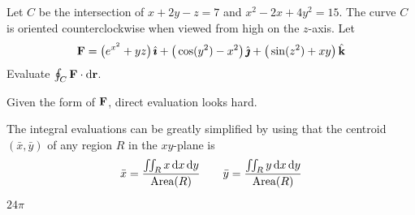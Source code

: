 \begin{question}
Let $C$ be the intersection of $x+2y-z=7$ and $x^2-2x+4y^2=15$.
The curve $C$ is oriented counterclockwise when viewed from high on the
$z$-axis. Let
\begin{equation*}
\mathbf{F}=\big(e^{x^2}+yz\big)\,\hat{\pmb{\imath}}
   +\big(\cos(y^2)-x^2\big)\,\hat{\pmb{\jmath}}
   +\big(\sin(z^2)+xy\big)\,\hat{\mathbf{k}}
\end{equation*}
Evaluate $\oint_C\mathbf{F}\cdot \mathrm{d}\mathbf{r}$.
\end{question}

\begin{hint} 
Given the form of $\mathbf{F}$, direct evaluation looks hard.

The integral evaluations can be greatly simplified by using
that the centroid $(\bar x,\bar y)$ of any region $R$ in the $xy$-plane
is
\begin{equation*}
\bar x =\frac{\iint_R x\,\mathrm{d}x\,\mathrm{d}y}{\text{Area}(R)}\qquad
\bar y =\frac{\iint_R y\,\mathrm{d}x\,\mathrm{d}y}{\text{Area}(R)}
\end{equation*}

\end{hint}

\begin{answer} 
$24\pi$
\end{answer}

